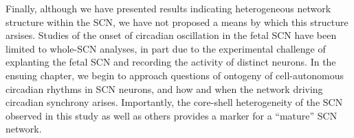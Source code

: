 Finally, although we have presented results indicating heterogeneous network structure within the SCN, we have not proposed a means by which this structure arsises.
Studies of the onset of circadian oscillation in the fetal SCN have been limited to whole-SCN analyses, in part due to the experimental challenge of explanting the fetal SCN and recording the activity of distinct neurons.
In the ensuing chapter, we begin to approach questions of ontogeny of cell-autonomous circadian rhythms in SCN neurons, and how and when the network driving circadian synchrony arises.
Importantly, the core-shell heterogeneity of the SCN observed in this study as well as others provides a marker for a ``mature'' SCN network.



























